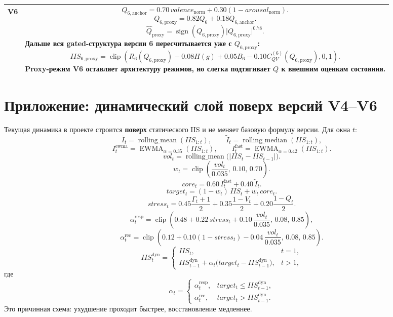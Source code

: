 \documentclass[12pt,a4paper]{article}
\newcommand{\sgn}{\operatorname{sign}}
\newcommand{\clip}{\operatorname{clip}}
\newcommand{\spow}[2]{\sgn(#1)\lvert #1 \rvert^{#2}}
\begin{document}
\begin{landscape}
\begin{longtable}{>{\raggedright\arraybackslash}p{1.6cm} >{\raggedright\arraybackslash}p{16.7cm}}
\textbf{V6} &
\[
Q_{6,\mathrm{anchor}}=
0.70\,valence_{\mathrm{norm}}+0.30(1-arousal_{\mathrm{norm}}).
\]
\[
Q_{6,\mathrm{proxy}}=0.82Q_6+0.18Q_{6,\mathrm{anchor}}.
\]
\[
\widehat{Q}_{\mathrm{proxy}}=\spow{Q_{6,\mathrm{proxy}}}{0.78}.
\]
Дальше вся gated-структура версии 6 пересчитывается уже с \(Q_{6,\mathrm{proxy}}\):
\[
IIS_{6,\mathrm{proxy}}=
\clip\!\left(
R_6(Q_{6,\mathrm{proxy}})
-0.08H(g)
+0.05B_6
-0.10C_{QV}^{(6)}(Q_{6,\mathrm{proxy}}),
0,1\right).
\]
Proxy-режим V6 оставляет архитектуру режимов, но слегка подтягивает \(Q\) к внешним оценкам состояния. \\

\bottomrule
\end{longtable}
\end{landscape}

\section{Приложение: динамический слой поверх версий V4--V6}
Текущая динамика в проекте строится \textbf{поверх} статического IIS и не меняет базовую формулу версии. Для окна \(t\):
\[
\overline{I}_t=\operatorname{rolling\_mean}(IIS_{1:t}),
\qquad
\widetilde{I}_t=\operatorname{rolling\_median}(IIS_{1:t}),
\]
\[
I^{\mathrm{ewma}}_t=\operatorname{EWMA}_{\alpha=0.35}(IIS_{1:t}),
\qquad
I^{\mathrm{fast}}_t=\operatorname{EWMA}_{\alpha=0.42}(IIS_{1:t}).
\]
\[
vol_t=\operatorname{rolling\_mean}\bigl(|IIS_t-IIS_{t-1}|\bigr).
\]
\[
w_t=\clip\!\left(\frac{vol_t}{0.035},\,0.10,\,0.70\right).
\]
\[
core_t=0.60\,I^{\mathrm{fast}}_t+0.40\,\widetilde{I}_t.
\]
\[
target_t=(1-w_t)\,IIS_t+w_t\,core_t.
\]
\[
stress_t=0.45\frac{\Gamma_t+1}{2}+0.35\frac{1-V_t}{2}+0.20\frac{1-Q_t}{2}.
\]
\[
\alpha^{\mathrm{resp}}_t=\clip\!\left(0.48+0.22\,stress_t+0.10\,\frac{vol_t}{0.035},\,0.08,\,0.85\right),
\]
\[
\alpha^{\mathrm{rec}}_t=\clip\!\left(0.12+0.10(1-stress_t)-0.04\,\frac{vol_t}{0.035},\,0.08,\,0.85\right).
\]
\[
IIS^{\mathrm{dyn}}_t=
\begin{cases}
IIS_t, & t=1,\\[4pt]
IIS^{\mathrm{dyn}}_{t-1}+\alpha_t\bigl(target_t-IIS^{\mathrm{dyn}}_{t-1}\bigr), & t>1,
\end{cases}
\]
где
\[
\alpha_t=
\begin{cases}
\alpha^{\mathrm{resp}}_t, & target_t\le IIS^{\mathrm{dyn}}_{t-1},\\[4pt]
\alpha^{\mathrm{rec}}_t, & target_t> IIS^{\mathrm{dyn}}_{t-1}.
\end{cases}
\]
Это причинная схема: ухудшение проходит быстрее, восстановление медленнее.
\end{document}
